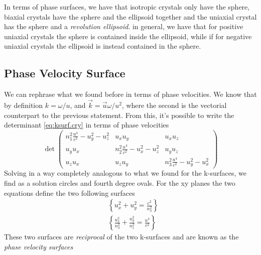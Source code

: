 \documentclass[../electromagnetism.tex]{subfiles}
\begin{document}
In terms of phase surfaces, we have that isotropic crystals only have the sphere, biaxial crystals have the sphere and the ellipsoid together and the uniaxial crystal has the sphere and a \textit{revolution ellipsoid}. in general, we have that for positive uniaxial crystals the sphere is contained inside the ellipsoid, while if for negative uniaxial crystals the ellipsoid is instead contained in the sphere.
\subsection{Phase Velocity Surface}
We can rephrase what we found before in terms of phase velocities. We know that by definition $k=\omega/u$, and $\vec{k}=\vec{u}\omega/u^2$, where the second is the vectorial counterpart to the previous statement. From this, it's possible to write the determinant \eqref{eq:ksurf.cry} in terms of phase velocities
\begin{equation}
	\det\begin{pmatrix}
		n_1^2\frac{u^4}{c^2}-u_y^2-u_z^2&u_xu_y&u_xu_z\\
		u_yu_x&n_2^2\frac{u^4}{c^2}-u_x^2-u_z^2&u_yu_z\\
		u_zu_x&u_zu_y&n_3^2\frac{u^4}{c^2}-u_y^2-u_x^2
	\end{pmatrix}
	\label{eq:phaseveldet.cry}
\end{equation}
Solving in a way completely analogous to what we found for the k-surfaces, we find as a solution circles and fourth degree ovals. For the xy planes the two equations define the two following surfaces
\begin{equation}
	\begin{aligned}
		&\left\{ u_x^2+u_y^2=\frac{c^2}{n_3^2} \right\}\\
		&\left\{ \frac{u_x^2}{n_3^2}+\frac{u_y^2}{n_1^2}=\frac{u^4}{c^2} \right\}
	\end{aligned}
	\label{eq:phasevelsur.cry}
\end{equation}
These two surfaces are \textit{reciprocal} of the two k-surfaces and are known as the \textit{phase velocity surfaces}
\end{document}
